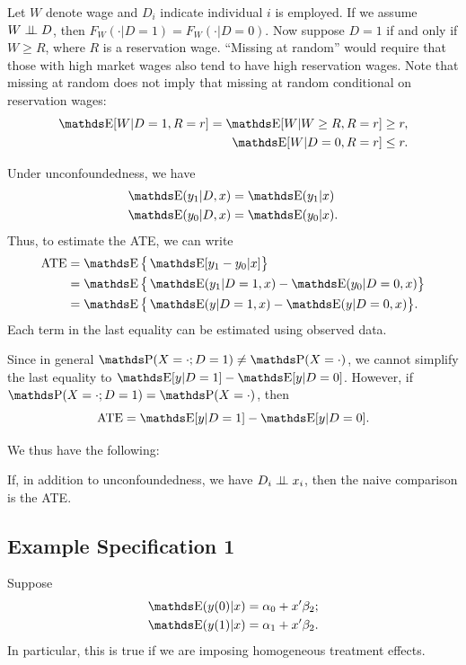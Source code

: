 \documentclass[letterpaper, 10pt]{article}
\DeclareMathOperator{\ATE}{ATE}
\begin{document}
\begin{example}
  Let \(W\) denote wage and \(D_i\) indicate individual \(i\) is employed.
  If we assume \(W \perp \!\!\! \perp D\), then \(F_W(\cdot | D = 1) = F_W(\cdot | D = 0)\).
  Now suppose \(D = 1\) if and only if \(W \geq R\), where \(R\) is a reservation wage.
  ``Missing at random'' would require that those with high market wages also tend to have high reservation wages.
  Note that missing at random does not imply that missing at random conditional on reservation wages:
  \begin{align*}
    \E[W|D = 1, R = r]
    = \E[W| W \geq R, R = r]
    &\geq r, \\
    \E[W|D = 0, R = r]
    &\leq r.
  \end{align*}
\end{example}


Under unconfoundedness, we have
\begin{align*}
  \E(y_1 |D, x)
  &= \E(y_1 | x) \\
  \E(y_0 |D, x)
  &= \E(y_0 | x).
\end{align*}
Thus, to estimate the ATE, we can write
\begin{align*}
  \ATE
  &= \E\big\{ \E[y_1 - y_0 | x] \big\} \\
  &= \E\big\{ \E(y_1 |D = 1, x) - \E(y_0 |D = 0, x) \big\} \\
  &= \E\big\{ \E(y |D = 1, x) - \E(y |D = 0, x) \big\}.
\end{align*}
Each term in the last equality can be estimated using observed data.

Since in general \(\P(X = \cdot; D = 1) \neq \P(X = \cdot)\), we cannot simplify the last equality to \(\E[y|D = 1] - \E[y|D = 0]\).
However, if \(\P(X = \cdot; D = 1) = \P(X = \cdot)\), then
\[
  \ATE = \E[y|D = 1] - \E[y|D = 0].
\]

We thus have the following:
\begin{proposition}
  If, in addition to unconfoundedness, we have \(D_i \perp \!\!\! \perp x_i\), then the naive comparison is the ATE.
\end{proposition}


\subsection{Example Specification 1}
Suppose
\begin{align*}
  \E(y(0)|x)
  &= \alpha_0 + x' \beta_2; \\
  \E(y(1)|x)
  &= \alpha_1 + x' \beta_2.
\end{align*}
In particular, this is true if we are imposing homogeneous treatment effects.
\end{document}
